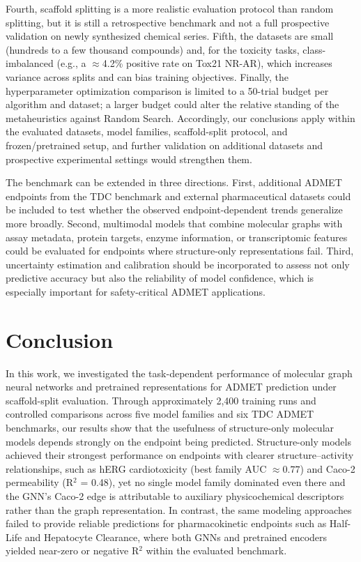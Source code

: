 \documentclass[journal]{IEEEtran}
\begin{document}
Fourth, scaffold splitting is a more realistic evaluation protocol than random splitting, but it is still a retrospective benchmark and not a full prospective validation on newly synthesized chemical series.
Fifth, the datasets are small (hundreds to a few thousand compounds) and, for the toxicity tasks, class-imbalanced (e.g., a $\approx$4.2\% positive rate on Tox21 NR-AR), which increases variance across splits and can bias training objectives.
Finally, the hyperparameter optimization comparison is limited to a 50-trial budget per algorithm and dataset; a larger budget could alter the relative standing of the metaheuristics against Random Search.
Accordingly, our conclusions apply within the evaluated datasets, model families, scaffold-split protocol, and frozen/pretrained setup, and further validation on additional datasets and prospective experimental settings would strengthen them.

The benchmark can be extended in three directions.
First, additional ADMET endpoints from the TDC benchmark and external pharmaceutical datasets could be included to test whether the observed endpoint-dependent trends generalize more broadly.
Second, multimodal models that combine molecular graphs with assay metadata, protein targets, enzyme information, or transcriptomic features could be evaluated for endpoints where structure-only representations fail.
Third, uncertainty estimation and calibration should be incorporated to assess not only predictive accuracy but also the reliability of model confidence, which is especially important for safety-critical ADMET applications.


\section{Conclusion}
\label{sec:conclusion}

In this work, we investigated the task-dependent performance of molecular graph neural networks and pretrained representations for ADMET prediction under scaffold-split evaluation. Through approximately 2{,}400 training runs and controlled comparisons across five model families and six TDC ADMET benchmarks, our results show that the usefulness of structure-only molecular models depends strongly on the endpoint being predicted. Structure-only models achieved their strongest performance on endpoints with clearer structure--activity relationships, such as hERG cardiotoxicity (best family AUC $\approx 0.77$) and Caco-2 permeability (R$^2$ = 0.48), yet no single model family dominated even there and the GNN's Caco-2 edge is attributable to auxiliary physicochemical descriptors rather than the graph representation. In contrast, the same modeling approaches failed to provide reliable predictions for pharmacokinetic endpoints such as Half-Life and Hepatocyte Clearance, where both GNNs and pretrained encoders yielded near-zero or negative R$^2$ within the evaluated benchmark.
\end{document}
